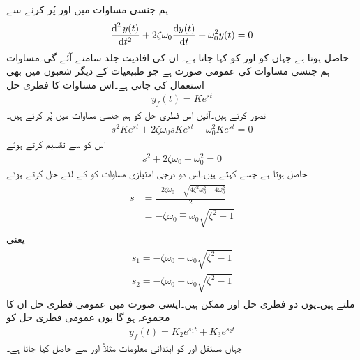 ہم جنسی مساوات میں  اور  پُر کرنے سے
\begin{align}\label{مساوات_عارضی_دو_درجی_عمومی_ہم_جنسی_ب}
\frac{\dif^{\,2} y(t)}{\dif t^2}+2\zeta \omega_0\frac{\dif y(t)}{\dif t}+\omega_0^2 y(t)=0
\end{align}
حاصل ہوتا ہے جہاں  کو 
 اور  کو  کہا جاتا ہے۔ ان کی افادیت جلد سامنے آئے گی۔مساوات   ہم جنسی مساوات کی عمومی صورت ہے جو طبیعیات کے دیگر شعبوں میں بھی استعمال کی جاتی ہے۔اس مساوات کا فطری حل
\begin{align*}
y_f(t)=Ke^{st}
\end{align*}
تصور کرتے ہیں۔آئیں اس فطری حل کو ہم جنسی مساوات میں پُر کرتے ہیں۔
\begin{align*}
s^2 K e^{st}+2\zeta\omega_0 s K e^{st}+\omega_0^2 K e^{st}=0
\end{align*}
اس کو  سے تقسیم کرتے ہوئے
\begin{align}
s^2+2\zeta\omega_0+\omega_0^2=0
\end{align}
حاصل ہوتا ہے جسے  کہتے ہیں۔اس دو درجی امتیازی مساوات کو  کے لئے حل کرتے ہوئے
\begin{gather}
\begin{aligned}
s&=\frac{-2\zeta\omega_0\mp\sqrt{4\zeta^2\omega_0^2-4\omega_0^2}}{2}\\
&=-\zeta\omega_0\mp \omega_0\sqrt{\zeta^2-1}
\end{aligned}
\end{gather}
یعنی
\begin{gather}
\begin{aligned}\label{مساوات_عارضی_دو_درجی_ہم_سمتی_عمومی_حل_الف}
s_1=-\zeta\omega_0+ \omega_0\sqrt{\zeta^2-1}\\
s_2=-\zeta\omega_0- \omega_0\sqrt{\zeta^2-1}
\end{aligned}
\end{gather}
ملتے ہیں۔یوں دو فطری حل  اور  ممکن ہیں۔ایسی صورت میں عمومی فطری حل ان کا مجموعہ ہو گا
یوں عمومی فطری حل کو 
\begin{align}
y_f(t)=K_2 e^{s_1 t}+K_3 e^{s_2 t}
\end{align}
جہاں مستقل  اور  کو ابتدائی معلومات مثلاً  اور  سے حاصل کیا جاتا ہے۔

